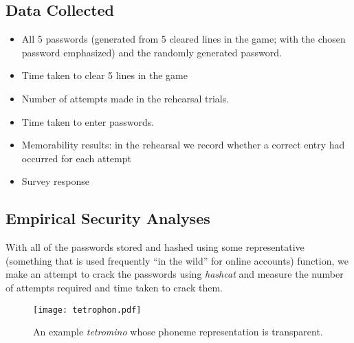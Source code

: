 \documentclass[conference]{IEEEtran}
\begin{document}
\subsection{Data Collected}
\begin{itemize}
	\item All 5 passwords (generated from 5 cleared lines in the game; with the chosen password emphasized) and the randomly generated password.
	\item Time taken to clear 5 lines in the game
	\item Number of attempts made in the rehearsal trials.
	\item Time taken to enter passwords.
	\item Memorability results: in the rehearsal we record whether a correct entry had occurred for each attempt
	\item Survey response
\end{itemize}
\subsection{Empirical Security Analyses}
With all of the passwords stored and hashed using some representative (something that is used frequently ``in the wild'' for online accounts) function, we make an attempt to crack the passwords using \emph{hashcat} \cite{report:hashcat} and measure the number of attempts required and time taken to crack them.
\begin{figure}[t]
	\texttt{[image: tetrophon.pdf]}
	\caption{An example \emph{tetromino} whose phoneme representation is transparent.}
	\label{tet}
\end{figure}
\end{document}
